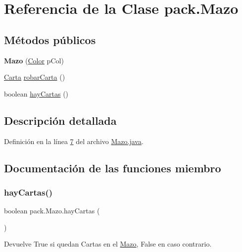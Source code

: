 \hypertarget{classpack_1_1_mazo}{}\section{Referencia de la Clase pack.\+Mazo}
\label{classpack_1_1_mazo}
\subsection*{Métodos públicos}
\begin{DoxyCompactItemize}
\item 
\mbox{\label{classpack_1_1_mazo_a858f1173f1dfd9efc81d373b9b795233}} 
{\bfseries Mazo} (\mbox{\hyperlink{enumpack_1_1_color}{Color}} p\+Col)
\item 
\mbox{\hyperlink{classpack_1_1_carta}{Carta}} \mbox{\hyperlink{classpack_1_1_mazo_a682be7abe3f14aed753a41c6f02e1cc8}{robar\+Carta}} ()
\item 
boolean \mbox{\hyperlink{classpack_1_1_mazo_a5a91b14bc0642621780196438e0c8437}{hay\+Cartas}} ()
\end{DoxyCompactItemize}


\subsection{Descripción detallada}


Definición en la línea \mbox{\hyperlink{_mazo_8java_source_l00007}{7}} del archivo \mbox{\hyperlink{_mazo_8java_source}{Mazo.\+java}}.



\subsection{Documentación de las funciones miembro}
\mbox{\label{classpack_1_1_mazo_a5a91b14bc0642621780196438e0c8437}} 
\subsubsection{\texorpdfstring{hayCartas()}{hayCartas()}}
{\footnotesize\ttfamily boolean pack.\+Mazo.\+hay\+Cartas (\begin{DoxyParamCaption}{ }\end{DoxyParamCaption})}

\begin{DoxyReturn}{Devuelve}
True si quedan Cartas en el \mbox{\hyperlink{classpack_1_1_mazo}{Mazo}}, False en caso contrario. 
\end{DoxyReturn}


